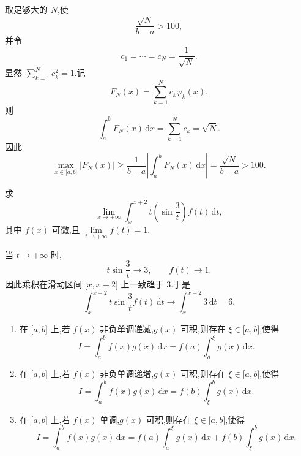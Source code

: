 \begin{solution}
    取足够大的 $N$,使
    \[
        \dfrac{\sqrt N}{b-a}>100,
    \]
    并令
    \[
        c_1=\cdots=c_N=\dfrac{1}{\sqrt N}.
    \]
    显然 $\displaystyle\sum\limits_{k=1}^{N}c_k^2=1$.记
    \[
        F_N(x)=\sum\limits_{k=1}^{N}c_k\varphi_k(x).
    \]
    则
    \[
        \displaystyle\int_a^bF_N(x)\,\mathrm{d}x
        =\sum\limits_{k=1}^{N}c_k=\sqrt N.
    \]
    因此
    \[
        \max\limits_{x\in\lbrack a,b\rbrack}|F_N(x)|
        \geq\dfrac{1}{b-a}\left|\int_a^bF_N(x)\,\mathrm{d}x\right|
        =\dfrac{\sqrt N}{b-a}>100.
    \]
\end{solution}

\begin{example}
    求
    \[
        \displaystyle\lim\limits_{x\to+\infty}
        \int_x^{x+2}t\left(\sin\dfrac{3}{t}\right)f(t)\,\mathrm{d}t,
    \]
    其中 $f(x)$ 可微,且 $\displaystyle\lim\limits_{t\to+\infty}f(t)=1$.
\end{example}
\exampleblank

\begin{solution}
    当 $t\to+\infty$ 时,
    \[
        t\sin\dfrac{3}{t}\longrightarrow3,
        \qquad
        f(t)\longrightarrow1.
    \]
    因此乘积在滑动区间 $\lbrack x,x+2\rbrack$ 上一致趋于 $3$.于是
    \[
        \displaystyle\int_x^{x+2}t\sin\dfrac{3}{t}f(t)\,\mathrm{d}t
        \longrightarrow\int_x^{x+2}3\,\mathrm{d}t
        =\boxed{6}.
    \]
\end{solution}

\begin{theorem}
    \leavevmode
    \begin{enumerate}
        \item 在 $\lbrack a,b\rbrack$ 上,若 $f(x)$ 非负单调递减,$g(x)$ 可积,则存在 $\xi\in\lbrack a,b\rbrack$,使得
              \[
                  I=\int_a^bf(x)g(x)\,\mathrm{d}x
                  =f(a)\int_a^\xi g(x)\,\mathrm{d}x.
              \]
        \item 在 $\lbrack a,b\rbrack$ 上,若 $f(x)$ 非负单调递增,$g(x)$ 可积,则存在 $\xi\in\lbrack a,b\rbrack$,使得
              \[
                  I=\int_a^bf(x)g(x)\,\mathrm{d}x
                  =f(b)\int_\xi^bg(x)\,\mathrm{d}x.
              \]
        \item 在 $\lbrack a,b\rbrack$ 上,若 $f(x)$ 单调,$g(x)$ 可积,则存在 $\xi\in\lbrack a,b\rbrack$,使得
              \[
                  I=\int_a^bf(x)g(x)\,\mathrm{d}x
                  =f(a)\int_a^\xi g(x)\,\mathrm{d}x
                  +f(b)\int_\xi^bg(x)\,\mathrm{d}x.
              \]
    \end{enumerate}
\end{theorem}


